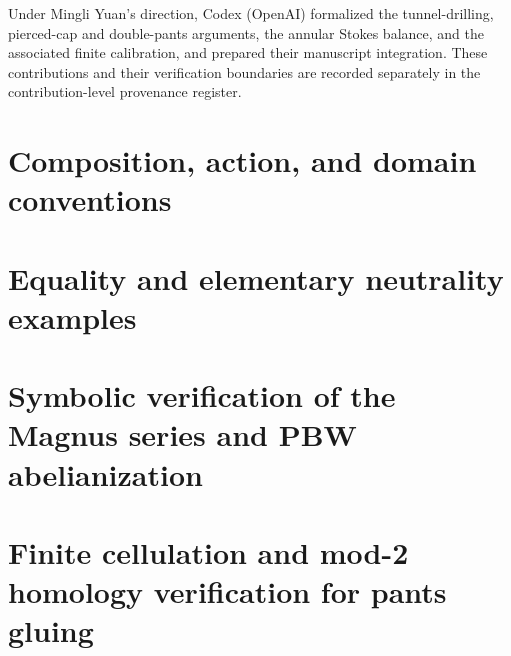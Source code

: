 \documentclass[11pt]{article}
\theoremstyle{definition}
\theoremstyle{remark}
\begin{document}
Under Mingli Yuan's direction, Codex (OpenAI) formalized the tunnel-drilling,
pierced-cap and double-pants arguments, the annular Stokes balance, and the
associated finite calibration, and prepared their manuscript integration.
These contributions and their verification boundaries are recorded separately
in the contribution-level provenance register.

\appendix
\section{Composition, action, and domain conventions}\label{app:conventions}

\section{Equality and elementary neutrality examples}\label{app:equality-neutrality}

\section{Symbolic verification of the Magnus series and PBW abelianization}\label{app:magnus-verification}

\section{Finite cellulation and mod-2 homology verification for pants gluing}\label{app:pants-cellulation-verification}




\end{document}
